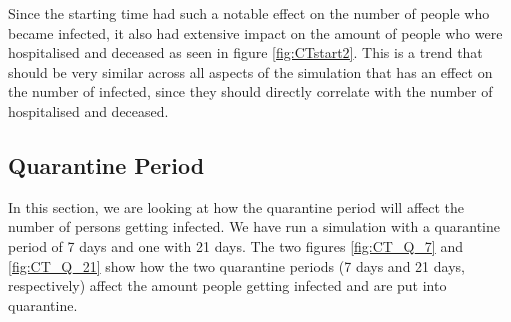 Since the starting time had such a notable effect on the number of people who became infected, it also had extensive impact on the amount of people who were hospitalised and deceased as seen in figure \ref{fig:CTstart2}. This is a trend that should be very similar across all aspects of the simulation that has an effect on the number of infected, since they should directly correlate with the number of hospitalised and deceased.

\subsection{Quarantine Period}
In this section, we are looking at how the quarantine period will affect the number of persons getting infected. We have run a simulation with a quarantine period of 7 days and one with 21 days. The two figures \ref{fig:CT_Q_7} and \ref{fig:CT_Q_21} show how the two quarantine periods (7 days and 21 days, respectively) affect the amount people getting infected and are put into quarantine.

